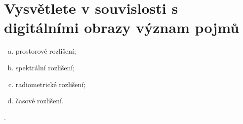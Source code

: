 \section{Vysvětlete v souvislosti s digitálními obrazy význam pojmů} 
\begin{enumerate}[a)]
    \item prostorové rozlišení;
    \item spektrální rozlišení;
    \item radiometrické rozlišení;
    \item časové rozlišení.
\end{enumerate}.
